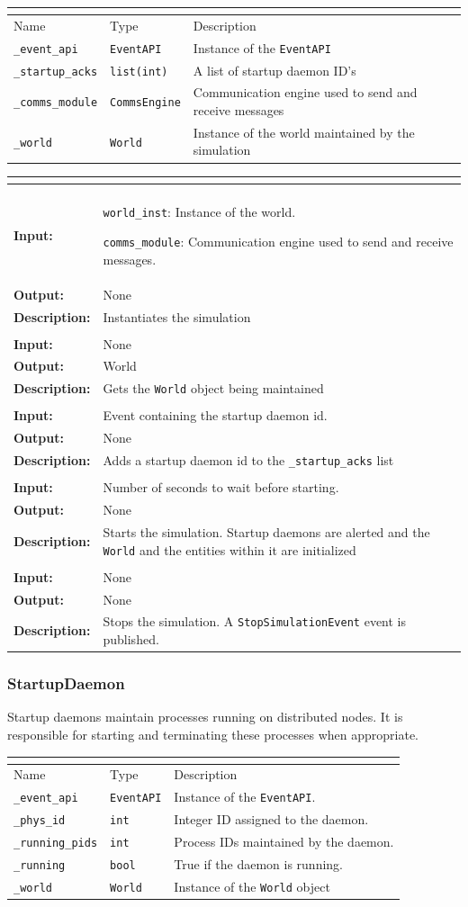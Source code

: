 \documentclass[titlepage]{article}
\renewenvironment{itemize*}
    {\begin{itemize}
        \setlength{\itemsep}{0pt}%
        \setlength{\parskip}{0pt}%
        \setlength{\partopsep}{0pt}%
        \setlength{\topsep}{0pt}}%
    {\end{itemize}}
\newcommand{\operations}[1]{
\begin{center}
    \begin{longtable}{|p{4cm}|p{10cm + 2.0\tabcolsep}|}
    \hline
    \multicolumn{2}{|l|}{\cellcolor[gray]{0.5}{\textbf{Operations}}} \\ \hline
#1
    \end{longtable}
\end{center}
}
\newcommand{\operation}[4]{
    \hline
    \multicolumn{2}{|l|}{\cellcolor[gray]{0.8}{\texttt{#1}}} \\ \hline
    \hspace{7pt}\textbf{Input:} & #2 \\ \hline
    \hspace{7pt}\textbf{Output:} & #3 \\ \hline
    \hspace{7pt}\textbf{Description:} & #4 \\ \hline
}
\newcommand{\attributes}[1]{
    \begin{center}
        \begin{tabular}{|p{3.5cm}|p{3.5cm}|p{7cm}|}
            \multicolumn{3}{|l|}{\cellcolor[gray]{0.5}{\textbf{Attributes}}} \\ \hline
            \rowcolor[gray]{0.8} Name & Type & Description \\ \hline 
            #1
        \end{tabular}
    \end{center}
}
\newcommand{\attribute}[3]{
    \texttt{#1} & \texttt{#2} & #3 \\ \hline
}
\begin{document}
\attributes{
    \attribute{\_event\_api}{EventAPI}{Instance of the \texttt{EventAPI}}
    \attribute{\_startup\_acks}{list(int)}{A list of startup daemon ID's}
    \attribute{\_comms\_module}{CommsEngine}{Communication engine used to send and receive messages}
    \attribute{\_world}{World}{Instance of the world maintained by the simulation}
}

\operations{
    \operation{\_\_init\_\_(world\_inst, comms\_module)}
    {
        \begin{itemize*}
            \item \texttt{world\_inst}: Instance of the world. 
            \item \texttt{comms\_module}: Communication engine used to send and receive messages.
        \end{itemize*}
    }{None}{Instantiates the simulation}
    \operation{get\_world()}{None}{World}{Gets the \texttt{World} object being maintained}
    \operation{get\_on\_ack\_startup(event)}{Event containing the startup daemon id.}{None}{Adds a startup daemon id to the \texttt{\_startup\_acks} list}
    \operation{start(wait)}{Number of seconds to wait before starting.}{None}{Starts the simulation. Startup daemons are alerted and the \texttt{World} and the entities within it are initialized}
    \operation{stop()}{None}{None}{Stops the simulation. A \texttt{StopSimulationEvent} event is published.}
}

\subsubsection{StartupDaemon}
{Startup daemons maintain processes running on distributed nodes. It is responsible for starting and terminating these processes when appropriate.}

\attributes{
    \attribute{\_event\_api}{EventAPI}{Instance of the \texttt{EventAPI}.}
    \attribute{\_phys\_id}{int}{Integer ID assigned to the daemon.}
    \attribute{\_running\_pids}{int}{Process IDs maintained by the daemon.}
    \attribute{\_running}{bool}{True if the daemon is running.}
    \attribute{\_world}{World}{Instance of the \texttt{World} object}
}
\end{document}
